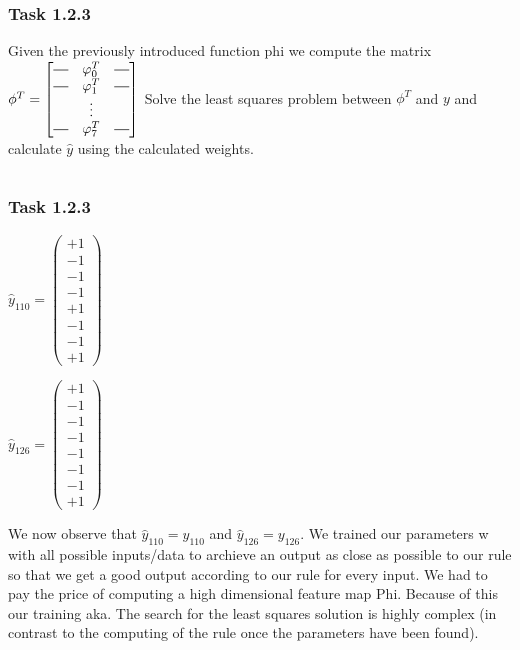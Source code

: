 \documentclass[10pt,aspectratio=169,handout]{beamer}
\begin{document}
\begin{frame}
    \frametitle{Task 1.2.3}
    Given the previously introduced function phi we compute the matrix
    $\phi^T = \begin{bmatrix}
            \rule[.5ex]{2.5ex}{0.5pt} & \varphi^T_0 & \rule[.5ex]{2.5ex}{0.5pt} \\
            \rule[.5ex]{2.5ex}{0.5pt} & \varphi^T_1 & \rule[.5ex]{2.5ex}{0.5pt} \\
                                      & \vdots      &                           \\
            \rule[.5ex]{2.5ex}{0.5pt} & \varphi^T_7 & \rule[.5ex]{2.5ex}{0.5pt} \\
        \end{bmatrix}$
    Solve the least squares problem between $\phi^T$ and $y$ and calculate $\hat{y}$ using the calculated weights.
    \inputminted[bgcolor=LightGray,fontsize=\small]{python}{matrixphi.py}
\end{frame}

\begin{frame}
    \frametitle{Task 1.2.3}
    \begin{minipage}{0.45\textwidth}
        $\hat{y}_{110}= \begin{pmatrix}
                +1 \\
                -1 \\
                -1 \\
                -1 \\
                +1 \\
                -1 \\
                -1 \\
                +1
            \end{pmatrix}$
    \end{minipage}
    \begin{minipage}{0.45\textwidth}
        $\hat{y}_{126}= \begin{pmatrix}
                +1 \\
                -1 \\
                -1 \\
                -1 \\
                -1 \\
                -1 \\
                -1 \\
                +1
            \end{pmatrix}$
    \end{minipage}
    
    \vspace{1cm}
    We now observe that $\hat{y}_{110}=y_{110}$ and $\hat{y}_{126}=y_{126}$.
    We trained our parameters w with all possible inputs/data to archieve an output as close as possible to our rule so that we get a good output according to our rule for every input. We had to pay the price of computing a high dimensional feature map Phi. Because of this our training aka. The search for the least squares solution is highly complex (in contrast to the computing of the rule once the parameters have been found).
\end{frame}
\end{document}
